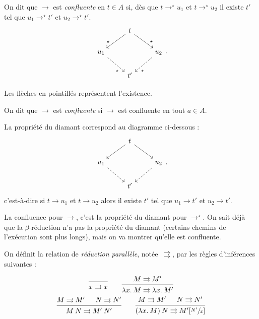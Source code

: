 \documentclass{../notes}
\let\rpar\rightrightarrows
\begin{document}
  \begin{defn}
    On dit que $\to$ est \textit{confluente} en $t \in A$ si, dès que $t \to^\star u_1$ et $t \to^\star u_2$ il existe $t'$ tel que $u_1 \to^\star t'$ et $u_2 \to^\star t'$.
    \[
    \begin{tikzcd}
      & t \arrow[near end]{dr}{\star} \arrow[near end,swap]{dl}{\star}\\
      u_1 \arrow[near end,swap,dashed]{dr}{\star} && u_2 \arrow[near end,dashed]{dl}{\star}\\
      & t'
    \end{tikzcd}
    .\]

    Les flèches en pointillés représentent l'existence.

    On dit que $\to$ est \textit{confluente} si $\to $ est confluente en tout $a \in A$.

    La propriété du diamant correspond au diagramme ci-dessous :
    \[
    \begin{tikzcd}
      & t \arrow[near end]{dr}{} \arrow[near end,swap]{dl}{}\\
      u_1 \arrow[near end,swap,dashed]{dr}{} && u_2 \arrow[near end,dashed]{dl}{}\\
      & t'
    \end{tikzcd}
    ,\]
    c'est-à-dire si $t \to u_1$ et $t\to u_2$ alors il existe $t'$ tel que $u_1 \to t'$ et $u_2 \to t'$.
  \end{defn}

  La confluence pour $\to$, c'est la propriété du diamant pour $\to^\star$.
  On sait déjà que la $\beta$-réduction n'a pas la propriété du diamant (certains chemins de l'exécution sont plus longs), mais on va montrer qu'elle est confluente.

  \begin{defn}
    On définit la relation de \textit{réduction parallèle}, notée~$\rpar$, par les règles d'inférences suivantes :

    \begin{gather*}
      \begin{prooftree}
        \infer 0{x \rpar x}
      \end{prooftree}
      \quad\quad
      \begin{prooftree}
        \hypo{M \rpar M'}
        \infer 1{\lambda x.\: M \rpar \lambda x.\: M'}
      \end{prooftree}\\
      \begin{prooftree}
        \hypo{M \rpar M'}
        \hypo{N \rpar N'}
        \infer 2{M \: N \rpar M' \: N'}
      \end{prooftree}
      \quad\quad
      \begin{prooftree}
        \hypo{M \rpar M'}
        \hypo{N \rpar N'}
        \infer 2{(\lambda x.\: M) \: N \rpar M'[\sfrac{N'}{x}]}
      \end{prooftree}\\
    \end{gather*}
  \end{defn}
\end{document}
